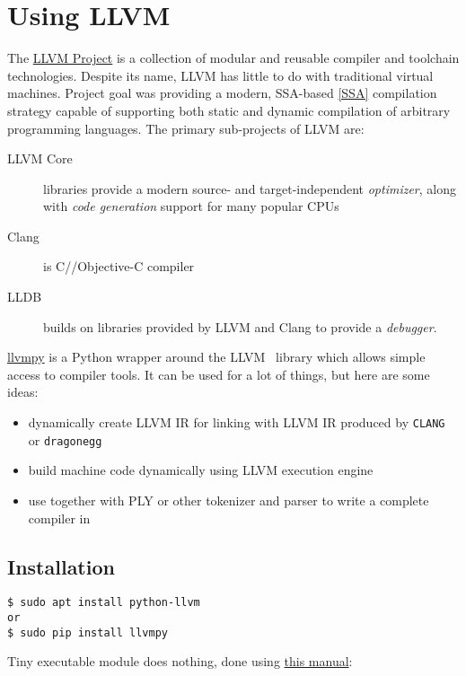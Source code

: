 \chapter{Using LLVM}\clearpage

The \href{http://llvm.org/}{LLVM Project} is a
collection of modular and reusable compiler and toolchain technologies. Despite
its name, LLVM has little to do with traditional virtual machines. Project goal
was providing a modern, SSA-based \ref{SSA}
compilation strategy capable of supporting both static and dynamic compilation
of arbitrary programming languages. The primary sub-projects of LLVM are:
\begin{description}
\item[LLVM Core] libraries provide a modern source- and target-independent
\emph{optimizer}, along with \emph{code generation} support for many popular
CPUs
\item[Clang] is C/\cpp/Objective-C compiler
\item[LLDB] builds on libraries provided by LLVM and Clang to provide a
\emph{debugger}.
\end{description}

\bigskip
\href{http://www.llvmpy.org/}{llvmpy} is a Python wrapper around the LLVM \cpp\
library which allows simple access to compiler tools.
It can be used for a lot of things, but here are some ideas:
\begin{itemize}[nosep]
  \item 
dynamically create LLVM IR for linking with LLVM IR produced by \verb|CLANG| or
\verb|dragonegg|
  \item 
build machine code dynamically using LLVM execution engine
  \item 
use together with PLY or other tokenizer and parser to write a complete compiler
in \py
\end{itemize}

\section{Installation}

\begin{verbatim}
$ sudo apt install python-llvm
or
$ sudo pip install llvmpy
\end{verbatim}


Tiny executable module does nothing, done using
\href{https://eli.thegreenplace.net/2012/08/10/building-and-using-llvmpy-a-basic-example}{this manual}:




